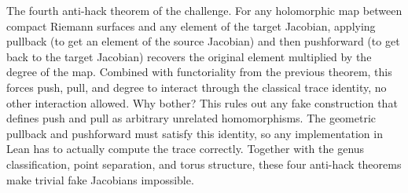 \begin{layman}
The fourth anti-hack theorem of the challenge. For any holomorphic
map between compact Riemann surfaces and any element of the target
Jacobian, applying pullback (to get an element of the source
Jacobian) and then pushforward (to get back to the target Jacobian)
recovers the original element multiplied by the degree of the map.
Combined with functoriality from the previous theorem, this forces
push, pull, and degree to interact through the classical trace
identity, no other interaction allowed. Why bother? This rules out
any fake construction that defines push and pull as arbitrary
unrelated homomorphisms. The geometric pullback and
pushforward must satisfy this identity, so any implementation in Lean
has to actually compute the trace correctly. Together with the genus
classification, point separation, and torus structure, these four
anti-hack theorems make trivial fake Jacobians impossible.
\end{layman}
